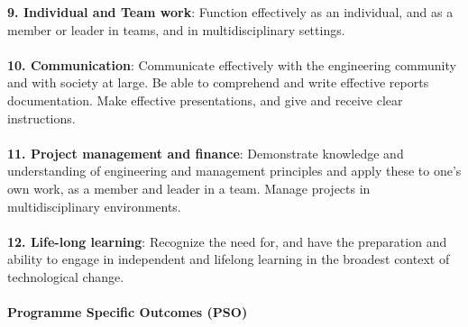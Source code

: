	\textbf{9. Individual and Team work}: Function effectively as an individual, and as a member or leader in teams, and in multidisciplinary settings. \\ \\
	\textbf{10.	Communication}: Communicate effectively with the engineering community and with society at large. Be able to comprehend and write effective reports documentation. Make effective presentations, and give and receive clear instructions. \\ \\
	\textbf{11.	Project management and finance}: Demonstrate knowledge and understanding of engineering and management principles and apply these to one's own work, as a member and leader in a team. Manage projects in multidisciplinary environments. \\ \\
	\textbf{12.	Life-long learning}: Recognize the need for, and have the preparation and ability to engage in independent and lifelong learning in the broadest context of technological change. \\ \\
	
\textbf{Programme Specific Outcomes (PSO)} \\
	
	
	
